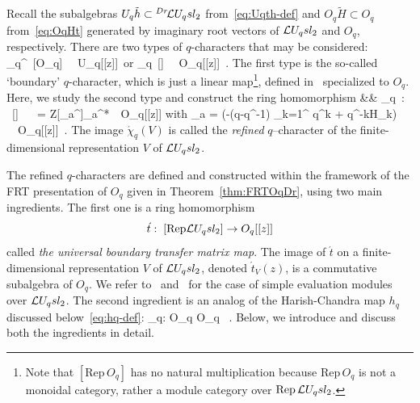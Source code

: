 \documentclass[11pt]{amsart}
\numberwithin{equation}{section}
\numberwithin{equation}{section}
\begin{document}
             Recall the subalgebras  $U_q\tilde{h}\subset {}^{Dr}\!\mathcal{L} U_q sl_2$ from~\eqref{eq:Uqth-def} and   $O_q\widetilde{H}\subset O_q$ from~\eqref{eq:OqHt} generated by imaginary root vectors of $\mathcal{L} U_q sl_2$ and $O_q$, respectively. There are two types of  $q$-characters that may be considered:
		    \beqa
		    \chi_q^\iota \colon \ [O_q] \ \rightarrow \ U_q[[z]]\ \quad \mbox{or} \quad\quad \acute{\chi}_q\colon \ [\Loop] \ \rightarrow \ O_q[[z]]\ .\label{eq:typechi}
		   \eeqa
		   The first type is the so-called `boundary' $q$-character, which is just a linear map\footnote{Note that $[\mathrm{Rep}\, O_q]$ has no natural  multiplication because $\mathrm{Rep}\, O_q$ is not a monoidal category, rather a module category over $\mathrm{Rep}\,\mathcal{L} U_q sl_2$.},
		   defined in~\cite[Def.\,3.1]{LPr25} specialized to $O_q$. Here, we study the second type and construct the ring homomorphism
		  \beqa
		  && \acute{\chi}_q\ : \ [\Loop] \ \rightarrow \  = {\mathbb Z}[_{a}^{}]_{a^*}\  \in \ O_q[[z]] \label{def:refchar}
		  \eeqa
		  with
          \beqa
		  _a = \exp\left(-(q-q^{-1}) \sum_{k=1}^{\infty}  {q^{k} + q^{-k}}{\acute H}_k\right)  \ \in \ O_q[[z]]\ .\label{eq:Ya}
		  \eeqa
The  image  $\acute{\chi}_q(V)$ is called the {\it refined} $q$–character of the finite-dimensional representation $V$ of $\mathcal{L} U_q sl_2$. 

The refined $q$-characters are defined and constructed within the framework of the FRT presentation of $O_q$ given in Theorem~\ref{thm:FRTOqDr}, using two main ingredients. The first one is a ring homomorphism
    \begin{equation}\label{eq:t-def}
         \acute{t} : \; [\mathrm{Rep}\mathcal{L} U_q sl_2] \to O_q[[z]]
         \end{equation}
         called \textit{the universal boundary transfer matrix map}.  
         The image of $\acute{t}$ on a finite-dimensional representation $V$ of $\mathcal{L} U_q sl_2$, denoted $\acute{t}_V(z)$, is a commutative subalgebra of $O_q$. We refer to~\cite[Chap.\,4]{L23} and~\cite[Sec.\,3.4]{BGL25} for the case of  simple evaluation modules over $\mathcal{L} U_q sl_2$. The second ingredient is an analog of the Harish-Chandra map $h_q$
         discussed below~\eqref{eq:hq-def}:
\beqa
{}_q: O_q \to O_q \ .
\eeqa
Below, we introduce and discuss both the ingredients in detail. 
\end{document}
